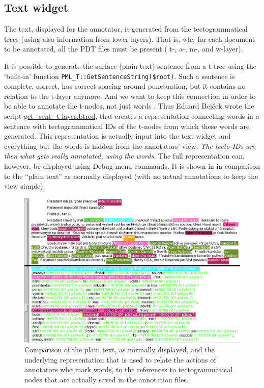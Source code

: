 \subsection{Text widget}
\label{sec:text-widget}
The text, displayed for the annotator, is generated from the tectogrammatical trees (using also information from lower layers). That is, why for each document to be annotated, all the PDT files must be present ( t-, a-, m-, and w-layer). 

It is possible to generate the surface (plain text) sentence from a t-tree using the `built-in' function \verb=PML_T::GetSentenceString($root)=. Such a sentence is complete, correct, has correct spacing around punctuation, but it contains no relation to the t-layer anymore. And we want to keep this connection in order to be able to annotate the t-nodes, not just words . Thus Eduard Bejček wrote the script \url{get_sent_t-layer.btred}, that creates a representation connecting words in a sentence with tectogrammatical IDs of the t-nodes from which these words are generated. This representation is actually input into the text widget and everything but the words is hidden from the annotators' view. \emph{The tecto-IDs are then what gets really annotated, \emph{using} the words.} The full representation can, however, be displayed using Debug menu commands. It is shown in  in comparison to the ``plain text'' as normally displayed (with no actual annotations to keep the view simple).

\begin{figure}[htbp]
   \centering
   \includegraphics[width=.95\textwidth]{images/hidden-text2}
   \caption{Comparison of the plain text, as normally displayed, and the underlying representation that is used to relate the actions of annotators who mark words, to the references to tectogrammatical nodes that are actually saved in the annotation files.}
   \label{fig:seman:hidden}
\end{figure}



